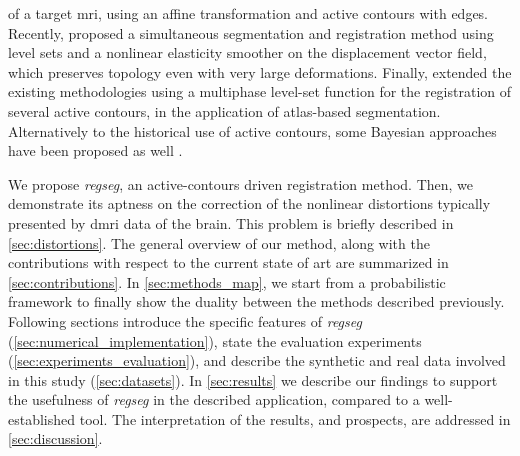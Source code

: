   of a target \gls*{mri}, using an affine transformation and active contours with edges.
Recently, \cite{guyader_combined_2011} proposed a simultaneous segmentation and
  registration method using level sets and a nonlinear elasticity smoother on the
  displacement vector field, which preserves topology even with very large deformations.
Finally, \cite{gorthi_active_2011} extended the existing methodologies using a multiphase
  level-set function for the registration of several active contours, in the application
  of atlas-based segmentation.
Alternatively to the historical use of active contours, some Bayesian approaches
  have been proposed as well \citep{wyatt_map_2003,pohl_bayesian_2006,gass_simultaneous_2014}.

We propose \emph{regseg}, an active-contours driven registration method.
Then, we demonstrate its aptness on the correction of the nonlinear distortions typically
  presented by \gls*{dmri} data of the brain.
This problem is briefly described in \autoref{sec:distortions}.
The general overview of our method, along with the contributions with respect 
  to the current state of art are summarized in \autoref{sec:contributions}.
In \autoref{sec:methods_map}, we start from a probabilistic framework to finally show the duality
  between the methods described previously.
Following sections
  introduce the specific features of \emph{regseg} (\autoref{sec:numerical_implementation}),
  state the evaluation experiments (\autoref{sec:experiments_evaluation}),
  and describe the synthetic and real data involved in this study (\autoref{sec:datasets}).
In \autoref{sec:results} we describe our findings to support the usefulness of \emph{regseg}
  in the described application, compared to a well-established tool.
The interpretation of the results, and prospects, are addressed in \autoref{sec:discussion}.


